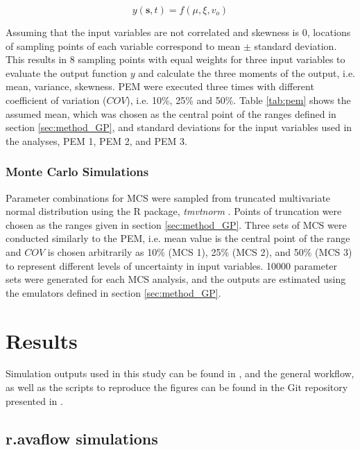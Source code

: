 \documentclass[utf8]{FrontiersinHarvard}
\begin{document}
\begin{equation}
    y\left ( \mathbf{s}, t \right)= f \left( \mu, \xi, v_o \right )
    \label{eq:model}
\end{equation}

Assuming that the input variables are not correlated and skewness is 0, locations of sampling points of each variable correspond to mean $\pm$ standard deviation. This results in 8 sampling points with equal weights for three input variables to evaluate the output function $y$ and calculate the three moments of the output, i.e. mean, variance, skewness. PEM were executed three times with different coefficient of variation ($COV$), i.e. 10\%, 25\% and 50\%. Table \ref{tab:pem} shows the assumed mean, which was chosen as the central point of the ranges defined in section \ref{sec:method_GP}, and standard deviations for the input variables used in the analyses, PEM 1, PEM 2, and PEM 3.

\subsubsection{Monte Carlo Simulations}
\label{sec:method_mcs}

Parameter combinations for MCS were sampled from truncated multivariate normal distribution using the R package, \textit{tmvtnorm} \citep{RJ-2010-005}. Points of truncation were chosen as the ranges given in section \ref{sec:method_GP}. Three sets of MCS were conducted similarly to the PEM, i.e. mean value is the central point of the range and $COV$ is chosen arbitrarily as 10\% (MCS 1), 25\% (MCS 2), and 50\% (MCS 3) to represent different levels of uncertainty in input variables. 10000 parameter sets were generated for each MCS analysis, and the outputs are estimated using the emulators defined in section \ref{sec:method_GP}.

\section{Results}
\label{sec:res}
Simulation outputs used in this study can be found in \citet{yildizetal}, and the general workflow, as well as the scripts to reproduce the figures can be found in the Git repository presented in \citet{yildizetalgit}.

\subsection{r.avaflow simulations}
\label{sec:res_sims}
\end{document}
